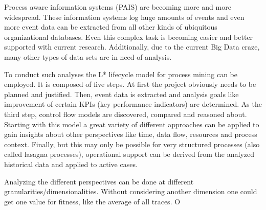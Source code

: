 Process aware information systems (PAIS) are becoming more and more widespread. These information systems log huge amounts of events and even more event data can be extracted from all other kinds of ubiquitous organizational databases. Even this complex task is becoming easier and better supported with current research. Additionally, due to the current Big Data craze, many other types of data sets are in need of analysis.

To conduct such analyses the L* lifecycle model for process mining \cite{vanderAalst2011} can be employed. It is composed of five steps. At first the project obviously needs to be planned and justified. Then, event data is extracted and analysis goals like improvement of certain KPIs (key performance indicators) are determined. As the third step, control flow models are discovered, compared and reasoned about. Starting with this model a great variety of different approaches can be applied to gain insights about other perspectives like time, data flow, resources and process context.
Finally, but this may only be possible for very structured processes (also called lasagna processes), operational support can be derived from the analyzed historical data and applied to active cases.

Analyzing the different perspectives can be done at different granularities/dimensionalities. Without considering another dimension one could get one value for fitness, like the average of all traces. O